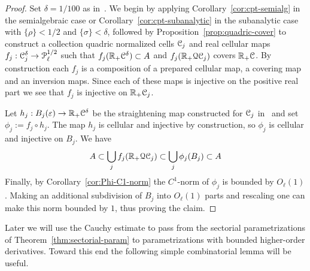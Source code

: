 \documentclass[reqno]{amsart}
\renewcommand\~[1]{\widetilde{#1}}
\def\cP{{\mathcal P}} \def\cR{{\mathcal R}}
\def\Qua{\mathcal{Q}}
\def\he#1{{\{#1\}}}
\def\hrho{{\he\rho}}
\def\hsigma{{\he\sigma}}
\begin{document}
\begin{proof}
  Set $\delta=1/100$ as in~.  We begin
  by applying Corollary~\ref{cor:cpt-semialg} in the semialgebraic
  case or Corollary~\ref{cor:cpt-subanalytic} in the subanalytic case
  with $\hrho<1/2$ and $\hsigma<\delta$, followed by
  Proposition~\ref{prop:quadric-cover} to construct a collection
  quadric normalized cells ${\mathcal C}_j$ and real cellular maps
  $f_j:\cC_j^\delta\to\cP_\ell^{1/2}$ such that
  $f_j({\mathbb R}_+{\mathcal C}^\delta)\subset A$ and $f_j(\R_+\Qua\cC_j)$ covers
  ${\mathbb R}_+{\mathcal C}$. By construction each $f_j$ is a composition of a prepared
  cellular map, a covering map and an inversion maps. Since each of
  these maps is injective on the positive real part we see that $f_j$
  is injective on ${\mathbb R}_+{\mathcal C}_j$.
  
  Let $h_j:B_j(\varepsilon)\to{\mathbb R}_+{\mathcal C}^\delta$ be the straightening map
  constructed for ${\mathcal C}_j$ in~ and set
  $\phi_j:=f_j\circ h_j$. The map $h_j$ is cellular and injective by
  construction, so $\phi_j$ is cellular and injective on $B_j$.  We
  have
  \begin{equation}
    A\subset \bigcup_j f_j(\R_+\Qua\cC_j) \subset \bigcup_j \phi_j(B_j) \subset A
  \end{equation}
  Finally, by Corollary~\ref{cor:Phi-C1-norm} the $C^1$-norm of
  $\phi_j$ is bounded by $O_\ell(1)$. Making an additional subdivision
  of $B_j$ into $O_\ell(1)$ parts and rescaling one can make this norm
  bounded by $1$, thus proving the claim.
\end{proof}

Later we will use the Cauchy estimate to pass from the sectorial
parametrizations of Theorem~\ref{thm:sectorial-param} to
parametrizations with bounded higher-order derivatives. Toward this
end the following simple combinatorial lemma will be useful.
\end{document}
